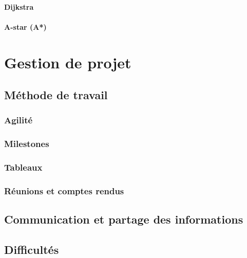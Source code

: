 \documentclass{article}
\begin{document}
\paragraph{Dijkstra}

\paragraph{A-star (A*)}

\newpage


\section{Gestion de projet}\label{sec:gestion-de-projet}

\subsection{Méthode de travail}\label{subsec:méthode-de-travail}

\subsubsection{Agilité}


\subsubsection{Milestones}

\subsubsection{Tableaux}

\subsubsection{Réunions et comptes rendus}

\subsection{Communication et partage des informations}\label{subsec:communication-et-partage-des-informations}

\subsection{Difficultés}\label{subsec:difficultés}
\end{document}
